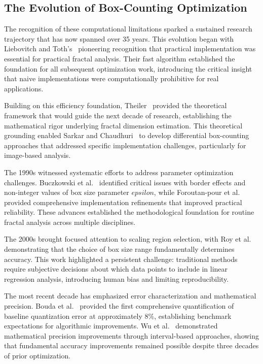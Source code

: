 \documentclass[preprint,12pt]{elsarticle}
\def\epsilon{epsilon}%
\begin{document}
\subsection{The Evolution of Box-Counting Optimization}

The recognition of these computational limitations sparked a sustained research trajectory that has now spanned over 35 years. This evolution began with Liebovitch and Toth's~\cite{liebovitch1989} pioneering recognition that practical implementation was essential for practical fractal analysis. Their fast algorithm established the foundation for all subsequent optimization work, introducing the critical insight that naive implementations were computationally prohibitive for real applications.

Building on this efficiency foundation, Theiler~\cite{theiler1990} provided the theoretical framework that would guide the next decade of research, establishing the mathematical rigor underlying fractal dimension estimation. This theoretical grounding enabled Sarkar and Chaudhuri~\cite{sarkar1994} to develop differential box-counting approaches that addressed specific implementation challenges, particularly for image-based analysis.

The 1990s witnessed systematic efforts to address parameter optimization challenges. Buczkowski et al.~\cite{buczkowski1998} identified critical issues with border effects and non-integer values of box size parameter $\epsilon$, while Foroutan-pour et al.~\cite{foroutan1999} provided comprehensive implementation refinements that improved practical reliability. These advances established the methodological foundation for routine fractal analysis across multiple disciplines.

The 2000s brought focused attention to scaling region selection, with Roy et al.~\cite{roy2007} demonstrating that the choice of box size range fundamentally determines accuracy. This work highlighted a persistent challenge: traditional methods require subjective decisions about which data points to include in linear regression analysis, introducing human bias and limiting reproducibility.

The most recent decade has emphasized error characterization and mathematical precision. Bouda et al.~\cite{bouda2016} provided the first comprehensive quantification of baseline quantization error at approximately 8\%, establishing benchmark expectations for algorithmic improvements. Wu et al.~\cite{wu2020} demonstrated mathematical precision improvements through interval-based approaches, showing that fundamental accuracy improvements remained possible despite three decades of prior optimization.
\end{document}
